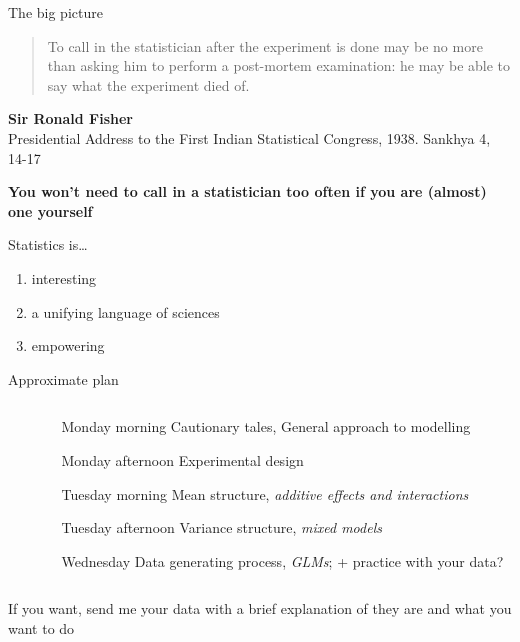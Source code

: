 \documentclass[10pt]{beamer}
\begin{document}
\begin{frame}{The big picture}
\begin{quote}
To call in the statistician after the experiment is done may be no more than asking him to perform a post-mortem examination: he may be able to say what the experiment died of.
\end{quote}
\textbf{Sir Ronald Fisher} \\ \footnotesize Presidential Address to the First Indian Statistical Congress, 1938. Sankhya 4, 14-17

\pause

\vfill
\textbf{You won't need to call in a statistician too often if you are (almost) one yourself}
\vfill

\pause 

\begin{exampleblock}{Statistics is\dots}
    \begin{enumerate}
     \item interesting
     \item a unifying language of sciences
     \item empowering 
    \end{enumerate}
\end{exampleblock}

\end{frame}

\begin{frame}{Approximate plan}
\begin{columns}
 \begin{column}{0.2\textwidth}
  
 \end{column}
 \begin{column}{0.8\textwidth}
 \begin{exampleblock}{}
    \begin{itemize}
     \item[Monday morning] Cautionary tales, General approach to modelling
     \item[Monday afternoon] Experimental design
     \item[Tuesday morning] Mean structure, \textit{additive effects and interactions}
     \item[Tuesday afternoon] Variance structure, \textit{mixed models}
     \item[Wednesday] Data generating process, \textit{GLMs}; + practice with your data?
    \end{itemize}
    \end{exampleblock}
    \end{column}
\end{columns}

If you want, send me your data with a brief explanation of they are and what you want to do
\end{frame}
\end{document}
